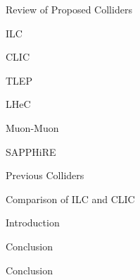 \documentclass[12pt]{article}
\begin{document}
 \begin{section}{Review of Proposed Colliders}
 
     \begin{subsection}{ILC}
         
     \end{subsection}
     \begin{subsection}{CLIC}
         
     \end{subsection}
     \begin{subsection}{TLEP}
         
     \end{subsection}
     \begin{subsection}{LHeC}
         
     \end{subsection}
     \begin{subsection}{Muon-Muon}
         
     \end{subsection}
     \begin{subsection}{SAPPHiRE}
             
     \end{subsection}
     \begin{subsection}{Previous Colliders}
             
     \end{subsection}

 \end{section}
 
 \begin{section}{Comparison of ILC and CLIC}
 
     \begin{subsection}{Introduction}
         
     \end{subsection}
     
     
     
     \begin{subsection}{Conclusion}
         
     \end{subsection}
     
 \end{section}
 
 \begin{section}{Conclusion}
 
     
 
 \end{section}
 
 \clearpage
 \printbibliography
 
\end{document}
